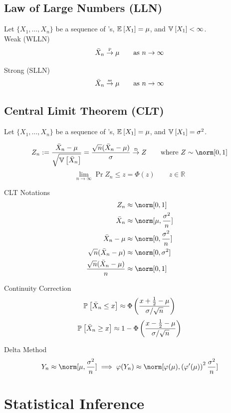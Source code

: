 \documentclass[landscape]{article}
\begin{document}
\begin{multicols*}{2}
\subsection{Law of Large Numbers (LLN)}

Let $\{X_1,\ldots,X_n\}$ be a sequence of \iid \rv's, $\mathbb{E}_{}\left[X_1\right]=\mu$, and 
$\mathbb{V}_{}\left[X_1\right] < \infty$.\\

Weak (WLLN)
$$\bar{X}_n \stackrel{\text{\tiny{P}}}{\rightarrow} \mu \qquad\text{as } n\to\infty$$

Strong (SLLN)
$$\bar{X}_n \stackrel{\text{\tiny{as}}}{\rightarrow} \mu \qquad\text{as } n\to\infty$$

\subsection{Central Limit Theorem (CLT)}

Let $\{X_1,\ldots,X_n\}$ be a sequence of \iid \rv's, $\mathbb{E}_{}\left[X_1\right]=\mu$, and 
$\mathbb{V}_{}\left[X_1\right] = \sigma^2$.

$$ Z_n
  := \displaystyle\frac{\samplemean-\mu}{\sqrt{\V{\samplemean}}}
  = \displaystyle\frac{\sqrt{n}(\samplemean - \mu)}{\sigma}
  \dconv Z \qquad \text{where } Z\dist \norm[0,1]$$
$$\lim_{n\to\infty} \Pr{Z_n \le z} = \Phi(z) \qquad z \in \mathbb R$$

CLT Notations
\begin{align*}
Z_n &\approx \norm[0,1] \\
\samplemean &\approx \norm[\mu,\frac{\sigma^2}{n}] \\
\samplemean - \mu &\approx \norm[0,\frac{\sigma^2}{n}] \\
\sqrt{n}(\samplemean - \mu) &\approx \norm[0,\sigma^2] \\
\frac{\sqrt{n}(\samplemean - \mu)}{n} &\approx \norm[0,1] \\
\end{align*}

Continuity Correction
$$\mathbb{P}_{}\left[\bar{X}_n \le x\right] \approx 
  \Phi\left(\displaystyle\frac{x+\frac{1}{2}-\mu}{\sigma/\sqrt{n}}\right)$$
$$\mathbb{P}_{}\left[\bar{X}_n \ge x\right] \approx 
  1-\Phi\left(\displaystyle\frac{x-\frac{1}{2}-\mu}{\sigma/\sqrt{n}}\right)$$

Delta Method
$$Y_n \approx \norm[\mu,\frac{\sigma^2}{n}] \imp 
\transform(Y_n) \approx 
\norm[\transform(\mu),
  \left(\transform^\prime(\mu)\right)^2\frac{\sigma^2}{n}]$$

\section{Statistical Inference}


\end{multicols*}
\end{document}
